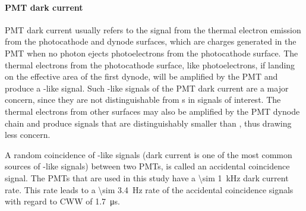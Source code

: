 \paragraph{PMT dark current}
\label{sec:events dark current}
PMT dark current usually refers to the signal from the thermal electron emission from the photocathode and dynode surfaces, which are charges generated in the PMT when no photon ejects photoelectrons from the photocathode surface. The thermal electrons from the photocathode surface, like photoelectrons, if landing on the effective area of the first dynode, will be amplified by the PMT and produce a \sphe -like signal. Such \sphe -like signals of the PMT dark current are a major concern, since they are not distinguishable from \sphe s in signals of interest. The thermal electrons from other surfaces may also be amplified by the PMT dynode chain and produce signals that are distinguishably smaller than \sphe , thus drawing less concern. 

A random coincidence of \sphe -like signals (dark current is one of the most common sources of \sphe -like signals) between two PMTs, is called an accidental coincidence signal. The PMTs that are used in this study have a \SI{\sim 1}{\kHz} dark current rate.  This rate leads to a \SI{\sim 3.4}{\Hz} rate of the accidental coincidence signals with regard to CWW of \SI{1.7}{\us}. 
 
